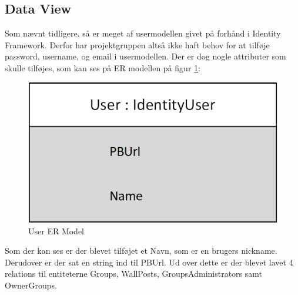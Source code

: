 \subsection{Data View}
Som nævnt tidligere, så er meget af usermodellen givet på forhånd i Identity Framework. Derfor har projektgruppen altså ikke haft behov for at tilføje password, username, og email i usermodellen. Der er dog nogle attributer som skulle tilføjes, som kan ses på ER modellen på figur \ref{fig:ER_Model_User}:

\begin{figure}[H]
    \centering
    \includegraphics[width=0.45\linewidth]{09_Arkitektur/User/Images/User_DatabaseModel.png}
    \caption{User ER Model}
    \label{fig:ER_Model_User}
\end{figure}

Som der kan ses er der blevet tilføjet et Navn, som er en brugers nickname. Derudover er der sat en string ind til PBUrl. Ud over dette er der blevet lavet 4 relations til entiteterne Groups, WallPosts, GroupsAdministrators samt OwnerGroups.

